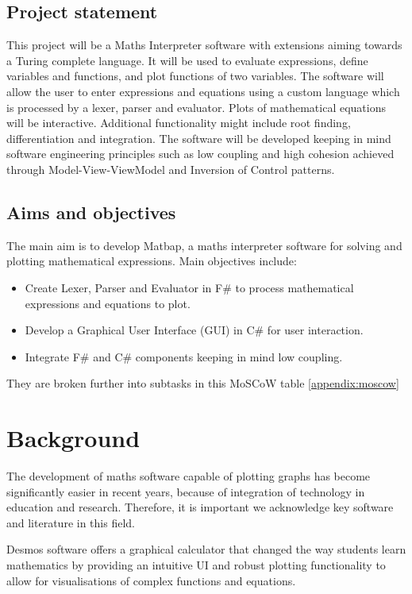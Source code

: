 \documentclass[a4paper, oneside, 11pt]{report}
\begin{document}
\section{Project statement}
This project will be a Maths Interpreter software with extensions aiming
towards a Turing complete language. It will be used to evaluate expressions, define
variables and functions, and plot functions of two variables. The software
will allow the user to enter expressions and equations using a custom language which is processed by a lexer, parser and evaluator. Plots of mathematical equations will be interactive. Additional functionality might include root finding, differentiation and integration. The software will be developed keeping in mind software engineering principles such as low coupling and high cohesion achieved through Model-View-ViewModel and Inversion of Control patterns. 

\section{Aims and objectives}
The main aim is to develop Matbap, a maths interpreter software for solving and plotting mathematical expressions. Main objectives include:
\begin{itemize}
    \item Create Lexer, Parser and Evaluator in F\# to process mathematical expressions and equations to plot.
    \item Develop a Graphical User Interface (GUI) in C\# for user interaction.
    \item Integrate F\# and C\# components keeping in mind low coupling.
\end{itemize}

\noindent %
They are broken further into subtasks in this MoSCoW table \ref{appendix:moscow} 






\chapter{Background}
The development of maths software capable of plotting graphs has become significantly easier in recent years, because of integration of technology in education and research. Therefore, it is important we acknowledge key software and literature in this field.

Desmos\cite{Desmos:2023} software offers a graphical calculator that changed the way students learn mathematics by providing an intuitive UI and robust plotting functionality to allow for visualisations of complex functions and equations.
\end{document}
